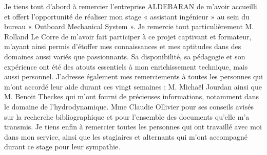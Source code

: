 Je tiens tout d’abord à remercier l’entreprise ALDEBARAN de m’avoir accueilli et offert l’opportunité de réaliser mon stage « assistant ingénieur » au sein du bureau « Outboard Mechanical System ».
Je remercie tout particulièrement M. Rolland Le Corre de m’avoir fait participer à ce projet captivant et formateur, m’ayant ainsi permis d’étoffer mes connaissances et mes aptitudes dans des domaines aussi variés que passionnants. Sa disponibilité, sa pédagogie et son expérience ont été des atouts essentiels à mon enrichissement technique, mais aussi personnel.
J’adresse également mes remerciements à toutes les personnes qui m’ont accordé leur aide durant ces vingt semaines :
M. Michaël Jourdan ainsi que M. Benoit Theckes qui m’ont fourni de précieuses informations, notamment dans le domaine de l’hydrodynamique.
Mme Claudie Ollivier pour ses conseils avisés sur la recherche bibliographique et pour l’ensemble des documents qu’elle m’a transmis.
Je tiens enfin à remercier toutes les personnes qui ont travaillé avec moi dans mon service, ainsi que les stagiaires et alternants qui m’ont accompagné durant ce stage pour leur sympathie.